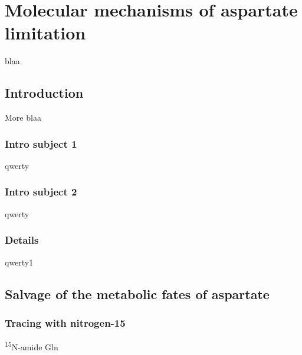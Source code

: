 \chapter{Molecular mechanisms of aspartate limitation}
blaa

\section{Introduction}
More blaa

\subsection{Intro subject 1}
qwerty

\subsection{Intro subject 2}
qwerty
\subsection{Details}
qwerty1



\section{Salvage of the metabolic fates of aspartate}

\subsection{Tracing with nitrogen-15}

\textsuperscript{15}N-amide Gln

